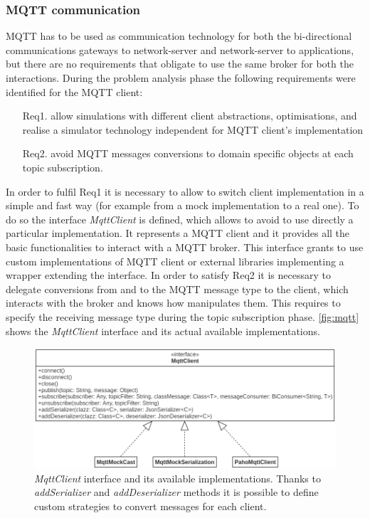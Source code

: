 \subsubsection{MQTT communication}
MQTT has to be used as communication technology for both the bi-directional communications gateways to network-server and network-server to applications, but there are no requirements that obligate to use the same broker for both the interactions. 
During the problem analysis phase the following requirements were identified for the MQTT client:
\begin{itemize}
    \item[Req1.] allow simulations with different client abstractions, optimisations, and realise a simulator technology independent for MQTT client's implementation 
    \item[Req2.] avoid MQTT messages conversions to domain specific objects at each topic \mbox{subscription}.
\end{itemize}
In order to fulfil Req1 it is necessary to allow to switch client implementation in a simple and fast way (for example from a mock implementation to a real one).
To do so the interface \mbox{\textit{MqttClient}} is defined, which allows to avoid to use directly a particular implementation.
It represents a MQTT client and it provides all the basic functionalities to interact with a MQTT broker. 
This interface grants to use custom implementations of MQTT client or external libraries implementing a wrapper extending the interface.
% 
In order to satisfy Req2 it is necessary to delegate conversions from and to the MQTT message type to the client, which interacts with the broker and knows how manipulates them.
% 
This requires to specify the receiving message type during the topic subscription phase.
% 
\autoref{fig:mqtt} shows the \mbox{\textit{MqttClient}} interface and its actual available implementations.
\begin{figure}[h]
    \centering
    \includegraphics[width=\textwidth]{figures/mqttClient.png}
    \caption[\textit{MqttClient} interface and its available implementations]{\textit{MqttClient} interface and its available implementations. Thanks to \mbox{\textit{addSerializer}} and \mbox{\textit{addDeserializer}} methods it is possible to define custom strategies to convert messages for each client.}
    \label{fig:mqtt}
\end{figure}

